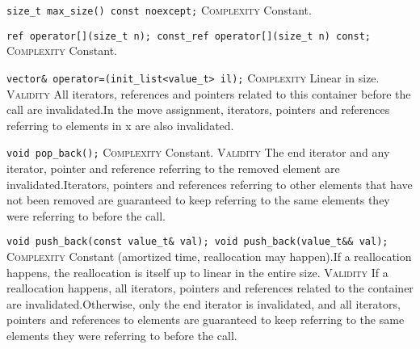 \noindent{}\hspace*{0.25em}\lstinline[basicstyle=\ttfamily\color{cgreen}]{size_t max_size() const noexcept;} \textsc{Complexity} Constant.\\\vspace{-0.6em}

\noindent{}\hspace*{0.25em}\lstinline[basicstyle=\ttfamily\color{cgreen}]{ref operator[](size_t n); const_ref operator[](size_t n) const;} \textsc{Complexity} Constant.\\\vspace{-0.6em}

\noindent{}\hspace*{0.25em}\lstinline[basicstyle=\ttfamily\color{corange}]{vector& operator=(init_list<value_t> il);} \textsc{Complexity} Linear in size. \textsc{Validity} All iterators, references and pointers related to this container before the call are invalidated.In the move assignment, iterators, pointers and references referring to elements in x are also invalidated.\\\vspace{-0.6em}

\noindent{}\hspace*{0.25em}\lstinline[basicstyle=\ttfamily\color{cgreen}]{void pop_back();} \textsc{Complexity} Constant. \textsc{Validity} The end iterator and any iterator, pointer and reference referring to the removed element are invalidated.Iterators, pointers and references referring to other elements that have not been removed are guaranteed to keep referring to the same elements they were referring to before the call.\\\vspace{-0.6em}

\noindent{}\hspace*{0.25em}\lstinline[basicstyle=\ttfamily\color{corange}]{void push_back(const value_t& val); void push_back(value_t&& val);} \textsc{Complexity} Constant (amortized time, reallocation may happen).If a reallocation happens, the reallocation is itself up to linear in the entire size. \textsc{Validity} If a reallocation happens, all iterators, pointers and references related to the container are invalidated.Otherwise, only the end iterator is invalidated, and all iterators, pointers and references to elements are guaranteed to keep referring to the same elements they were referring to before the call.\\\vspace{-0.6em}

